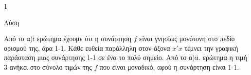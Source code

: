 \begin{ylh}{1}
    \item [Ύλη από εικόνα]
\end{ylh}
\begin{alist}
\item Λύση
\item Από το α)i ερώτημα έχουμε ότι η συνάρτηση $f$ είναι γνησίως μονότονη στο πεδίο ορισμού της, άρα 1-1. Κάθε ευθεία παράλληλη στον άξονα $x'x$ τέμνει την γραφική παράσταση μιας συνάρτησης 1-1 σε ένα το πολύ σημείο. Από το α)ii. ερώτημα η τιμή 3 ανήκει στο σύνολο τιμών της $f$ που είναι μοναδικό, αφού η συνάρτηση είναι 1-1.
\end{alist}